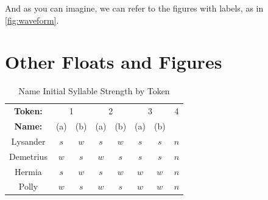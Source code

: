 \documentclass[12pt, letterpaper]{article}
\begin{document}
	And as you can imagine, we can refer to the figures with labels, as in \ref{fig:waveform}.

	\section{Other Floats and Figures}

	\begin{table}[ht]
		\caption{Name Initial Syllable Strength by Token}
		\label{tbl:strength}
		\begin{center}
			\begin{tabular}{c|ccccccc}
				\hline
				\textbf{Token:}&\multicolumn{2}{c}{1}&\multicolumn{2}{c}{2}&\multicolumn{2}{c}{3}&4\\
				\textbf{Name:}&(a)&(b)&(a)&(b)&(a)&(b)&\\
				\hline
				\hline
				Lysander&$s$&$w$&$s$&$w$&$s$&$s$&$n$\\
				Demetrius&$w$&$s$&$w$&$s$&$s$&$s$&$n$\\
				Hermia&$s$&$w$&$s$&$w$&$w$&$w$&$n$\\
				Polly&$w$&$s$&$w$&$s$&$w$&$w$&$n$\\
				\hline
			\end{tabular}
		\end{center}
	\end{table}
\end{document}
